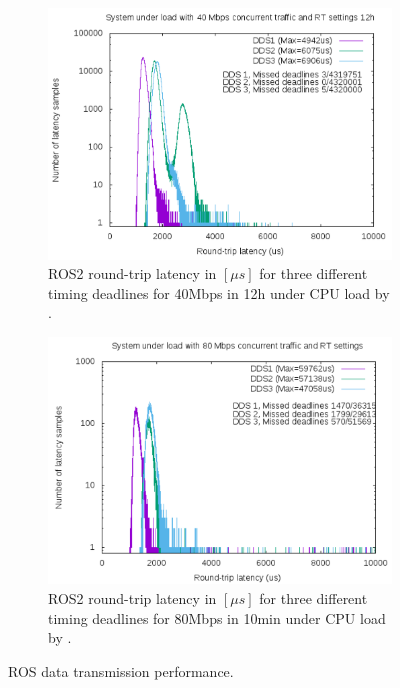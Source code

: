 \begin{figure}
\begin{subfigure}[b]{0.49\textwidth}
		\includegraphics[width=\textwidth]{Bilder/ROS2Realtime.PNG}
		\caption{ROS2 round-trip latency in $[\mu s]$ for three different timing deadlines for 40Mbps in 12h under \ac{CPU} load by \cite{ROSRealtime}.}
		\label{fig_ROS2RT}
	\end{subfigure}
	\hfill
	\begin{subfigure}[b]{0.49\textwidth}
		\centering
		\includegraphics[width=\textwidth]{Bilder/ROS2RealtimeOver.PNG}
		\caption{ROS2 round-trip latency in $[\mu s]$ for three different timing deadlines for 80Mbps in 10min under \ac{CPU} load by \cite{ROSRealtime}.}
		\label{fig_ROS2RTOver}
	\end{subfigure}	
	\caption{ROS data transmission performance.}
	\label{fig_ROSPerform}
\end{figure}
